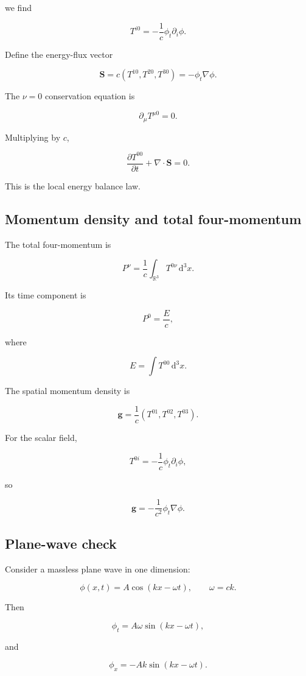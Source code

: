 we find

\[
T^{i0}
=
-\frac{1}{c}
\phi_t\partial_i\phi.
\]

Define the energy-flux vector

\[
\boxed{
\mathbf{S}
=
c
\left(
T^{10},
T^{20},
T^{30}
\right)
=
-\phi_t\nabla\phi
}.
\]

The \(\nu=0\) conservation equation is

\[
\partial_{\mu}T^{\mu0}=0.
\]

Multiplying by \(c\),

\[
\boxed{
\frac{\partial T^{00}}{\partial t}
+
\nabla\cdot\mathbf{S}
=
0
}.
\]

This is the local energy balance law.

\subsection{Momentum density and total four-momentum}

The total four-momentum is

\[
\boxed{
P^{\nu}
=
\frac{1}{c}
\int_{\mathbb{R}^{3}}
T^{0\nu}
\,\mathrm{d}^{3}x
}.
\]

Its time component is

\[
P^{0}
=
\frac{E}{c},
\]

where

\[
E
=
\int
T^{00}
\,\mathrm{d}^{3}x.
\]

The spatial momentum density is

\[
\boxed{
\mathbf{g}
=
\frac{1}{c}
\left(
T^{01},
T^{02},
T^{03}
\right)
}.
\]

For the scalar field,

\[
T^{0i}
=
-\frac{1}{c}
\phi_t\partial_i\phi,
\]

so

\[
\boxed{
\mathbf{g}
=
-\frac{1}{c^{2}}
\phi_t\nabla\phi
}.
\]

\subsection{Plane-wave check}

Consider a massless plane wave in one dimension:

\[
\phi(x,t)
=
A\cos(kx-\omega t),
\qquad
\omega=ck.
\]

Then

\[
\phi_t
=
A\omega\sin(kx-\omega t),
\]

and

\[
\phi_x
=
-Ak\sin(kx-\omega t).
\]

